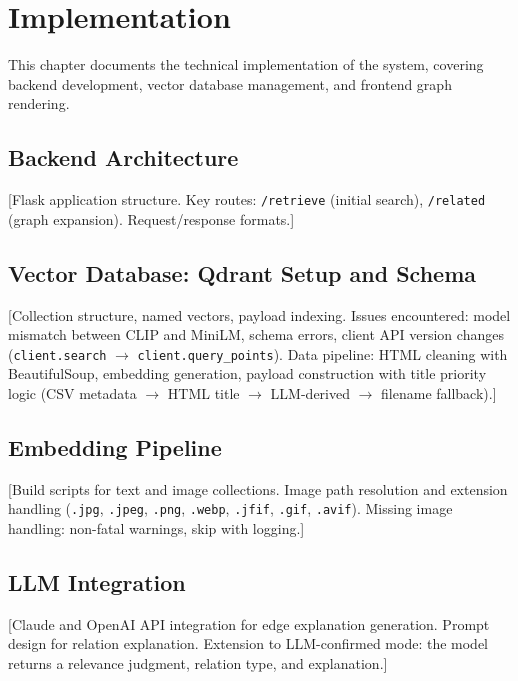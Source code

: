 \documentclass[12pt, a4paper]{article}
\begin{document}
\section{Implementation}

This chapter documents the technical implementation of the system, covering backend
development, vector database management, and frontend graph rendering.

\subsection{Backend Architecture}

[Flask application structure. Key routes: \texttt{/retrieve} (initial search), \texttt{/related}
(graph expansion). Request/response formats.]

\subsection{Vector Database: Qdrant Setup and Schema}

[Collection structure, named vectors, payload indexing. Issues encountered: model mismatch
between CLIP and MiniLM, schema errors, client API version changes
(\texttt{client.search} $\rightarrow$ \texttt{client.query\_points}). Data pipeline: HTML cleaning
with BeautifulSoup, embedding generation, payload construction with title priority logic
(CSV metadata $\rightarrow$ HTML title $\rightarrow$ LLM-derived $\rightarrow$ filename
fallback).]

\subsection{Embedding Pipeline}

[Build scripts for text and image collections. Image path resolution and extension handling
(\texttt{.jpg}, \texttt{.jpeg}, \texttt{.png}, \texttt{.webp}, \texttt{.jfif}, \texttt{.gif},
\texttt{.avif}). Missing image handling: non-fatal warnings, skip with logging.]

\subsection{LLM Integration}

[Claude and OpenAI API integration for edge explanation generation. Prompt design for relation
explanation. Extension to LLM-confirmed mode: the model returns a relevance judgment, relation
type, and explanation.]
\end{document}

